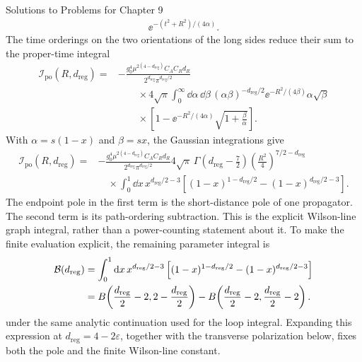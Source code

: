 \begin{bankssolutions}{Solutions to Problems for Chapter 9}
\begin{align*}
 \ee^{-(t^2+R^2)/(4\alpha)}.
\end{align*}
The time orderings on the two orientations of the long sides reduce their
sum to the proper-time integral
\begin{align}
 \mathcal I_{\mathrm{po}}(R,d_{\mathrm{reg}})={}&-
 \frac{g_0^4\mu^{2(4-d_{\mathrm{reg}})}C_A C_R d_R}
 {2^{d_{\mathrm{reg}}}\pi^{d_{\mathrm{reg}}/2}}\\[-2pt]
 &\qquad\times4\sqrt\pi\int_0^\infty\dd\alpha\,\dd\beta\,
 (\alpha\beta)^{-d_{\mathrm{reg}}/2}\ee^{-R^2/(4\beta)}\alpha\sqrt\beta
 \nonumber\\[-2pt]
 &\qquad\times\left[1-\ee^{-R^2/(4\alpha)}
 \sqrt{1+\frac{\beta}{\alpha}}\right].
 \label{eq:9.10-sol-po-alpha}
\end{align}
With $\alpha=s(1-x)$ and $\beta=sx$, the Gaussian integrations give
\begin{align}
 \mathcal I_{\mathrm{po}}(R,d_{\mathrm{reg}})={}&-
 \frac{g_0^4\mu^{2(4-d_{\mathrm{reg}})}C_A C_Rd_R}{2^{d_{\mathrm{reg}}}\pi^{d_{\mathrm{reg}}/2}}
 4\sqrt\pi\,\Gamma\!\left(d_{\mathrm{reg}}-\frac72\right)
 \left(\frac{R^2}{4}\right)^{7/2-d_{\mathrm{reg}}}
 \nonumber\\
 &\quad\times\int_0^1\dd x\,x^{d_{\mathrm{reg}}/2-3}
 \left[(1-x)^{1-d_{\mathrm{reg}}/2}-(1-x)^{d_{\mathrm{reg}}/2-3}\right].
 \label{eq:9.10-sol-po-beta}
\end{align}
The endpoint pole in the first term is the short-distance pole of one
propagator.  The second term is its path-ordering subtraction.  This is the
explicit Wilson-line graph integral, rather than a power-counting statement about it.  To
make the finite evaluation explicit, the remaining parameter integral is
\[
 \begin{aligned}
 {\cal B}(d_{\mathrm{reg}})&=\int_0^1\mathop{}\!\mathrm{d} x\,x^{d_{\mathrm{reg}}/2-3}
 \left[(1-x)^{1-d_{\mathrm{reg}}/2}-(1-x)^{d_{\mathrm{reg}}/2-3}\right]\\
 &=B\!\left(\frac {d_{\mathrm{reg}}}{2}-2,2-\frac {d_{\mathrm{reg}}}{2}\right)
  -B\!\left(\frac {d_{\mathrm{reg}}}{2}-2,\frac {d_{\mathrm{reg}}}{2}-2\right).
 \end{aligned}
\]
under the same analytic continuation used for the loop integral.  Expanding
this expression at $d_{\mathrm{reg}}=4-2\varepsilon$, together with the transverse
polarization below, fixes both the pole and the finite Wilson-line constant.


\end{bankssolutions}
